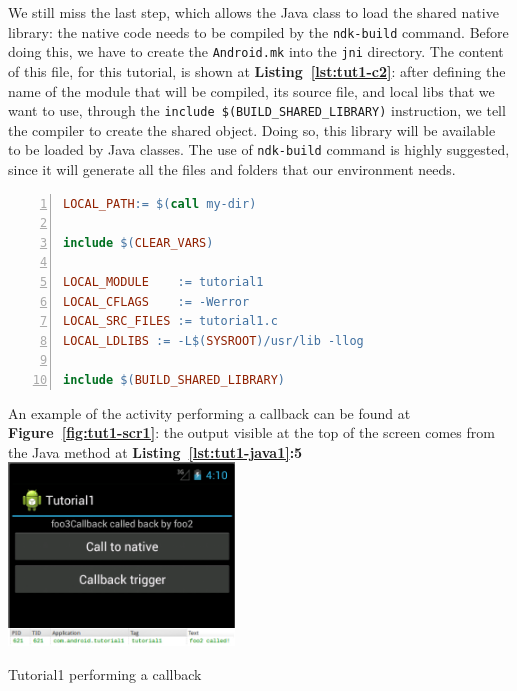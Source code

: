 \documentclass[a4paper,10pt]{article}
\makeatletter
\newenvironment{figurehere}{\def\@captype{figure}\vspace{2ex}}{\vspace{2ex}}
\newcommand{\keyword}[1]{\texttt{#1}}
\newcommand{\reff}[1]{\textbf{Figure~\ref{#1}}}
\newcommand{\refl}[1]{\textbf{Listing~\ref{#1}}}
\makeatother
\begin{document}
\begin{multicols}{2}
\begin{itemize}
\end{itemize}
We still miss the last step, which allows the Java class to load the shared native library: the native code needs to be compiled by the \keyword{ndk-build} command. Before doing this, we have to create the \keyword{Android.mk} into the \keyword{jni} directory. The content of this file, for this tutorial, is shown at \refl{lst:tut1-c2}: after defining the name of the module that will be compiled, its source file, and local libs that we want to use, through the \keyword{include \$(BUILD\_SHARED\_LIBRARY)} instruction, we tell the compiler to create the shared object. Doing so, this library will be available to be loaded by Java classes. The use of \keyword{ndk-build} command is highly suggested, since it will generate all the files and folders that our environment needs.

\begin{lstlisting}[language=make,
				   columns=fullflexible,
				   showstringspaces=false,
				   xleftmargin=15pt,
				   frame = l,
				   numbers=left,
				   commentstyle=\color{gray}\upshape,
				   caption=Android.mk for tutorial1.c,
				   label=lst:tut1-c2]
LOCAL_PATH:= $(call my-dir)

include $(CLEAR_VARS)

LOCAL_MODULE    := tutorial1
LOCAL_CFLAGS    := -Werror
LOCAL_SRC_FILES := tutorial1.c
LOCAL_LDLIBS := -L$(SYSROOT)/usr/lib -llog

include $(BUILD_SHARED_LIBRARY)
\end{lstlisting}

An example of the activity performing a callback can be found at \reff{fig:tut1-scr1}: the output visible at the top of the screen comes from the Java method at \refl{lst:tut1-java1}\textbf{:5}\\

\begin{figurehere}
 \centering
 \includegraphics[width=6cm]{./figures/tut1-scr1.png}
 \caption{Tutorial1 performing a callback}
 \label{fig:tut1-scr1}
\end{figurehere}


\end{multicols}
\end{document}
